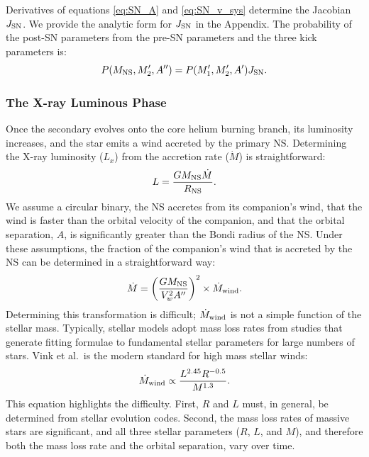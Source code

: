 \documentclass[12pt, preprint]{aastex}
\begin{document}
Derivatives of equations \ref{eq:SN_A} and \ref{eq:SN_v_sys} determine the Jacobian $J_{\rm SN}$. We provide the analytic form for $J_{\rm SN}$ in the Appendix. The probability of the post-SN parameters from the pre-SN parameters and the three kick parameters is:
\begin{equation}
P(M_{\rm NS}, M_2', A'') = P(M_1', M_2', A') J_{\rm SN}. \label{eq:P_SN}
\end{equation}





\subsubsection{The X-ray Luminous Phase} \label{sec:trans_XRB}

Once the secondary evolves onto the core helium burning branch, its luminosity increases, and the star emits a wind accreted by the primary NS. Determining the X-ray luminosity ($L_x$) from the accretion rate ($\dot{M}$) is straightforward: 
\begin{equation}
L = \frac{G M_{\rm NS} \dot{M}}{R_{\rm NS}}.
\end{equation}
We assume a circular binary, the NS accretes from its companion's wind, that the wind is faster than the orbital velocity of the companion, and that the orbital separation, $A$, is significantly greater than the Bondi radius of the NS. Under these assumptions, the fraction of the companion's wind that is accreted by the NS can be determined in a straightforward way:
\begin{equation}
\dot{M} = \left( \frac{G M_{\rm NS}}{V_w^2 A''} \right)^2 \times \dot{M}_{\rm wind}.
\end{equation}
Determining this transformation is difficult; $\dot{M}_{\rm wind}$ is not a simple function of the stellar mass. Typically, stellar models adopt mass loss rates from studies that generate fitting formulae to fundamental stellar parameters for large numbers of stars. Vink et al.\ is the modern standard for high mass stellar winds:
\begin{equation}
\dot{M}_{\rm wind} \propto \frac{L^{2.45} R^{-0.5}}{M^{1.3}}. \label{eq:vink}
\end{equation}
This equation highlights the difficulty. First, $R$ and $L$ must, in general, be determined from stellar evolution codes. Second, the mass loss rates of massive stars are significant, and all three stellar parameters ($R$, $L$, and $M$), and therefore both the mass loss rate and the orbital separation, vary over time. 
\end{document}
